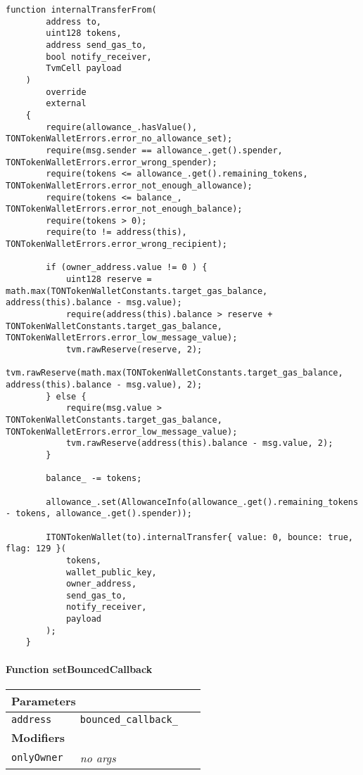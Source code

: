 \vspace{2cm}

\begin{lstlisting}[firstnumber=423]
    function internalTransferFrom(
        address to,
        uint128 tokens,
        address send_gas_to,
        bool notify_receiver,
        TvmCell payload
    )
        override
        external
    {
        require(allowance_.hasValue(), TONTokenWalletErrors.error_no_allowance_set);
        require(msg.sender == allowance_.get().spender, TONTokenWalletErrors.error_wrong_spender);
        require(tokens <= allowance_.get().remaining_tokens, TONTokenWalletErrors.error_not_enough_allowance);
        require(tokens <= balance_, TONTokenWalletErrors.error_not_enough_balance);
        require(tokens > 0);
        require(to != address(this), TONTokenWalletErrors.error_wrong_recipient);

        if (owner_address.value != 0 ) {
            uint128 reserve = math.max(TONTokenWalletConstants.target_gas_balance, address(this).balance - msg.value);
            require(address(this).balance > reserve + TONTokenWalletConstants.target_gas_balance, TONTokenWalletErrors.error_low_message_value);
            tvm.rawReserve(reserve, 2);
            tvm.rawReserve(math.max(TONTokenWalletConstants.target_gas_balance, address(this).balance - msg.value), 2);
        } else {
            require(msg.value > TONTokenWalletConstants.target_gas_balance, TONTokenWalletErrors.error_low_message_value);
            tvm.rawReserve(address(this).balance - msg.value, 2);
        }

        balance_ -= tokens;

        allowance_.set(AllowanceInfo(allowance_.get().remaining_tokens - tokens, allowance_.get().spender));

        ITONTokenWallet(to).internalTransfer{ value: 0, bounce: true, flag: 129 }(
            tokens,
            wallet_public_key,
            owner_address,
            send_gas_to,
            notify_receiver,
            payload
        );
    }
\end{lstlisting}

\paragraph{Function setBouncedCallback}


\ifsoltables
\noindent\begin{tabular}{|l|l|p{5cm}|}\hline
\multicolumn{3}{|l|}{\bf Parameters}\\\hline
\tt address & \tt bounced\_{}callback\_{} &\\\hline
\multicolumn{3}{|l|}{\bf Modifiers}\\\hline
\tt onlyOwner & {\em no args} &\\\hline
\end{tabular}
\fi

